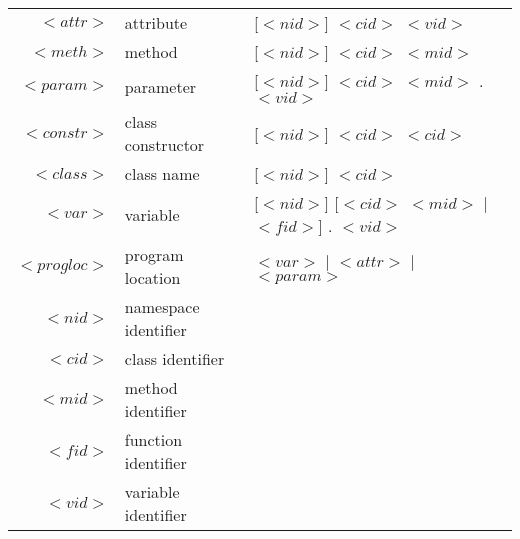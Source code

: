 \documentclass[preview,border=20pt,varwidth]{standalone}
\begin{document}
\begin{adjustwidth}{-0.45cm}{}
\begin{small}
\begin{tabular}{ r l l }
    $<attr>$ & attribute & [$<nid>$] $<cid>$ $<vid>$ \\
    $<meth>$ & method & [$<nid>$] $<cid>$ $<mid>$ \\
    $<param>$ & parameter & [$<nid>$] $<cid>$ $<mid>$ $.$ $<vid>$ \\
    $<constr>$ & class constructor & [$<nid>$] $<cid>$ $<cid>$ \\
    $<class>$ & class name & [$<nid>$] $<cid>$ \\
    $<var>$ & variable & [$<nid>$] [$<cid>$ $<mid>$ $|$ $<fid>$] $.$ $<vid>$ \\
    $<progloc>$ & program location & $<var>$ $|$ $<attr>$ $|$ $<param>$ \\
    $<nid>$ & namespace identifier & \\
    $<cid>$ & class identifier & \\
    $<mid>$ & method identifier & \\
    $<fid>$ & function identifier & \\
    $<vid>$ & variable identifier & \\
\end{tabular}
\end{small}
\end{adjustwidth}
\end{document}
